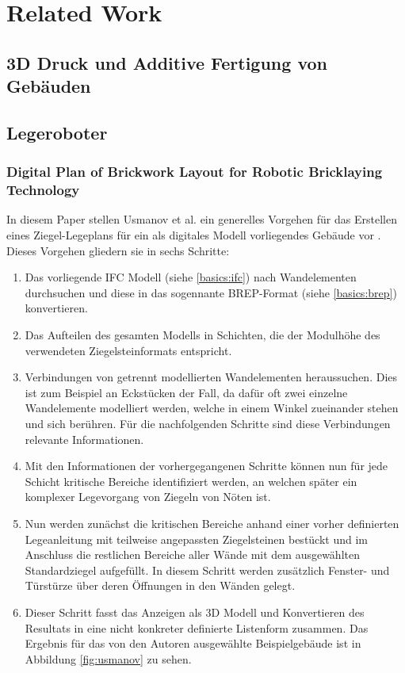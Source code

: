\section{Related Work} \label{related}
\subsection{3D Druck und Additive Fertigung von Gebäuden}
\subsection{Legeroboter}
\subsubsection{Digital Plan of Brickwork Layout for Robotic Bricklaying Technology}
In diesem Paper stellen Usmanov et al. ein generelles Vorgehen für das Erstellen eines Ziegel-Legeplans für ein als digitales Modell vorliegendes Gebäude vor \cite{Usmanov2021}.
Dieses Vorgehen gliedern sie in sechs Schritte:
\begin{enumerate}
\item Das vorliegende IFC Modell (siehe \ref{basics:ifc}) nach Wandelementen durchsuchen und diese in das sogennante BREP-Format (siehe \ref{basics:brep}) konvertieren.
\item Das Aufteilen des gesamten Modells in Schichten, die der Modulhöhe des verwendeten Ziegelsteinformats entspricht.
\item Verbindungen von getrennt modellierten Wandelementen heraussuchen. Dies ist zum Beispiel an Eckstücken der Fall, da dafür oft zwei einzelne Wandelemente modelliert werden, welche in einem Winkel zueinander stehen und sich berühren. Für die nachfolgenden Schritte sind diese Verbindungen relevante Informationen.
\item  Mit den Informationen der vorhergegangenen Schritte können nun für jede Schicht kritische Bereiche identifiziert werden, an welchen später ein komplexer Legevorgang von Ziegeln von Nöten ist.
\item  Nun werden zunächst die kritischen Bereiche anhand einer vorher definierten Legeanleitung mit teilweise angepassten Ziegelsteinen bestückt und im Anschluss die restlichen Bereiche aller Wände mit dem ausgewählten Standardziegel aufgefüllt. In diesem Schritt werden zusätzlich Fenster- und Türstürze über deren Öffnungen in den Wänden gelegt.
\item Dieser Schritt fasst das Anzeigen als 3D Modell und Konvertieren des Resultats in eine nicht konkreter definierte Listenform zusammen. Das Ergebnis für das von den Autoren ausgewählte Beispielgebäude ist in Abbildung \ref{fig:usmanov} zu sehen.
\end{enumerate}

